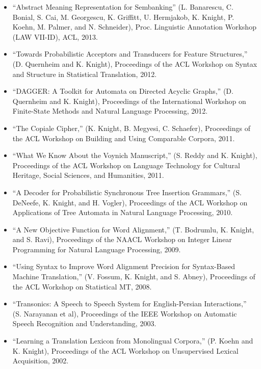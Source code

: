 \begin{itemize}
\item ``Abstract Meaning Representation for Sembanking'' (L. Banarescu, C. Bonial, S. Cai, M. Georgescu, K. Griffitt, U. Hermjakob, K. Knight, P. Koehn, M. Palmer, and N. Schneider), Proc. Linguistic Annotation Workshop (LAW VII-ID), ACL, 2013.

\item ``Towards Probabilistic Acceptors and Transducers for Feature Structures,'' (D. Quernheim and K. Knight), 
Proceedings of the
ACL Workshop on Syntax and Structure in Statistical Translation, 2012.

\item ``DAGGER: A Toolkit for Automata on Directed Acyclic Graphs,'' (D. Quernheim and K. Knight), 
Proceedings of the 
International Workshop on Finite-State Methods and Natural Language Processing, 2012. 

\item ``The Copiale Cipher,''
(K. Knight, B. Megyesi, C. Schaefer), 
Proceedings of the
ACL Workshop on Building and Using Comparable Corpora, 2011.

\item ``What We Know About the Voynich Manuscript,''
(S. Reddy and K. Knight), Proceedings of the ACL Workshop on
Language Technology for Cultural Heritage, Social Sciences, and
Humanities, 2011.

\item ``A Decoder for Probabilistic Synchronous Tree Insertion Grammars,''
(S. DeNeefe, K. Knight, and H. Vogler), Proceedings of the ACL Workshop on
Applications of Tree Automata in Natural Language Processing, 2010.

\item ``A New Objective Function for Word Alignment,''
(T. Bodrumlu, K. Knight, and S. Ravi), Proceedings of the NAACL Workshop on
Integer Linear Programming for Natural Language Processing, 2009.

\item ``Using Syntax to Improve Word Alignment Precision for Syntax-Based 
Machine Translation,'' (V. Fossum, K. Knight, and S. Abney), Proceedings of
the ACL Workshop on Statistical MT, 2008. 

\item ``Transonics: A Speech to Speech System for English-Persian
Interactions,'' (S. Narayanan et al), Proceedings of the IEEE Workshop on
Automatic Speech Recognition and Understanding, 2003.

\item ``Learning a Translation Lexicon from Monolingual Corpora,'' (P. Koehn 
and K. Knight), Proceedings of the ACL Workshop on Unsupervised Lexical 
Acquisition, 2002.


\end{itemize}

